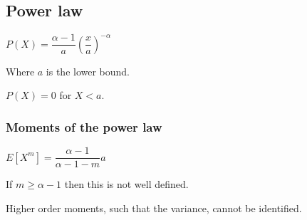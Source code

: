 
\subsection{Power law}

\(P(X)=\dfrac{\alpha -1}{a}(\dfrac{x}{a})^{-\alpha }\)

Where \(a\) is the lower bound.

\(P(X)=0\) for \(X<a\).

\subsubsection{Moments of the power law}

\(E[X^m]=\dfrac{\alpha - 1}{\alpha -1 -m }a\)

If \(m\ge \alpha -1 \) then this is not well defined.

Higher order moments, such that the variance, cannot be identified.


